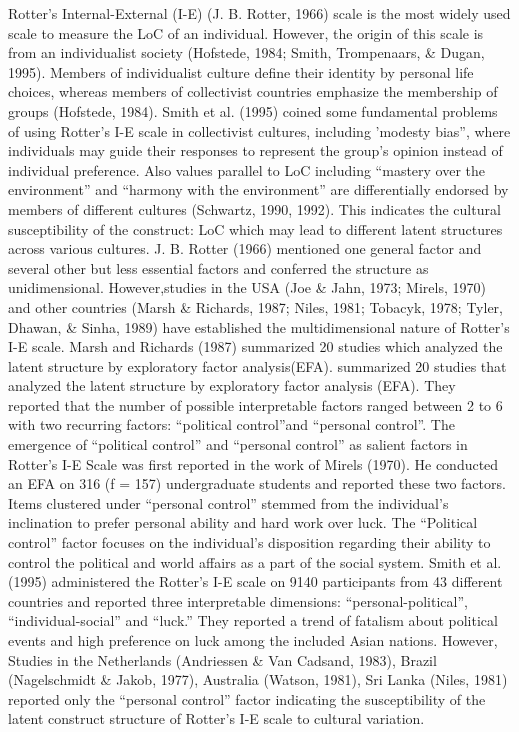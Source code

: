 \documentclass[
  man]{apa6}
\begin{document}
Rotter's Internal-External (I-E) (J. B. Rotter, 1966) scale is the most widely used scale to measure the LoC of an individual. However, the origin of this scale is from an individualist society (Hofstede, 1984; Smith, Trompenaars, \& Dugan, 1995). Members of individualist culture define their identity by personal life choices, whereas members of collectivist countries emphasize the membership of groups (Hofstede, 1984). Smith et al. (1995) coined some fundamental problems of using Rotter's I-E scale in collectivist cultures, including 'modesty bias'', where individuals may guide their responses to represent the group's opinion instead of individual preference. Also values parallel to LoC including ``mastery over the environment'' and ``harmony with the environment'' are differentially endorsed by members of different cultures (Schwartz, 1990, 1992). This indicates the cultural susceptibility of the construct: LoC which may lead to different latent structures across various cultures. J. B. Rotter (1966) mentioned one general factor and several other but less essential factors and conferred the structure as unidimensional. However,studies in the USA (Joe \& Jahn, 1973; Mirels, 1970) and other countries (Marsh \& Richards, 1987; Niles, 1981; Tobacyk, 1978; Tyler, Dhawan, \& Sinha, 1989) have established the multidimensional nature of Rotter's I-E scale. Marsh and Richards (1987) summarized 20 studies which analyzed the latent structure by exploratory factor analysis(EFA). summarized 20 studies that analyzed the latent structure by exploratory factor analysis (EFA). They reported that the number of possible interpretable factors ranged between 2 to 6 with two recurring factors: ``political control''and ``personal control''. The emergence of ``political control'' and ``personal control'' as salient factors in Rotter's I-E Scale was first reported in the work of Mirels (1970). He conducted an EFA on 316 (f = 157) undergraduate students and reported these two factors. Items clustered under ``personal control'' stemmed from the individual's inclination to prefer personal ability and hard work over luck. The ``Political control'' factor focuses on the individual's disposition regarding their ability to control the political and world affairs as a part of the social system. Smith et al. (1995) administered the Rotter's I-E scale on 9140 participants from 43 different countries and reported three interpretable dimensions: ``personal-political'', ``individual-social'' and ``luck.'' They reported a trend of fatalism about political events and high preference on luck among the included Asian nations. However, Studies in the Netherlands (Andriessen \& Van Cadsand, 1983), Brazil (Nagelschmidt \& Jakob, 1977), Australia (Watson, 1981), Sri Lanka (Niles, 1981) reported only the ``personal control'' factor indicating the susceptibility of the latent construct structure of Rotter's I-E scale to cultural variation.
\end{document}
